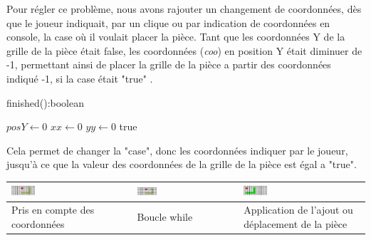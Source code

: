        Pour régler ce problème, nous avons rajouter un changement de coordonnées, dès que le joueur indiquait, par un clique ou par indication de coordonnées en console, la case où il voulait placer la pièce. Tant que les coordonnées Y de la grille de la pièce était false, les coordonnées (\textit{coo}) en position Y était diminuer de -1, permettant ainsi de placer la grille de la pièce a partir des coordonnées indiqué -1, si la case était "true" .

       \begin{algorithm}[H]\label{alg:whilePlacementPiece}
		         \caption{finished():boolean}
                 $posY \leftarrow 0$\;
                 $xx \leftarrow 0$\;
                 $yy \leftarrow 0$\;
				\Return true
			\end{algorithm}

        Cela permet de changer la "case", donc les coordonnées indiquer par le joueur, jusqu'à ce que la valeur des coordonnées de la grille de la pièce est égal a "true".

        \begin{center}
            \begin{tabular}{|m{4.5cm}|m{4.5cm}|m{4.5cm}|}
                \hline
                \includegraphics[width=0.20\textwidth, keepaspectratio]{img/pieceLCliqueFantome.png} & \includegraphics[width=0.20\textwidth, keepaspectratio]{img/pieceLCliqueFantome-1.png} & \includegraphics[width=0.20\textwidth, keepaspectratio]{img/pieceLCliqueMis.png}\\
                \hline
                {\small Pris en compte des coordonnées} & {\small Boucle while} & {\small Application de l'ajout ou déplacement de la pièce}\\
                \hline
            \end{tabular}
        \end{center}

